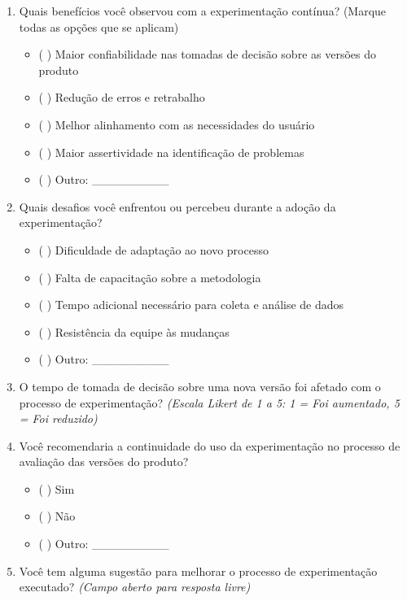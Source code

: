 \begin{enumerate}
        \item Quais benefícios você observou com a experimentação contínua? (Marque todas as opções que se aplicam)
        \begin{itemize}
            \item ( ) Maior confiabilidade nas tomadas de decisão sobre as versões do produto
            \item ( ) Redução de erros e retrabalho
            \item ( ) Melhor alinhamento com as necessidades do usuário
            \item ( ) Maior assertividade na identificação de problemas
            \item ( ) Outro: \_\_\_\_\_\_\_\_\_
        \end{itemize}
    
        \item Quais desafios você enfrentou ou percebeu durante a adoção da experimentação?
        \begin{itemize}
            \item ( ) Dificuldade de adaptação ao novo processo
            \item ( ) Falta de capacitação sobre a metodologia
            \item ( ) Tempo adicional necessário para coleta e análise de dados
            \item ( ) Resistência da equipe às mudanças
            \item ( ) Outro: \_\_\_\_\_\_\_\_\_
        \end{itemize}
    
        \item O tempo de tomada de decisão sobre uma nova versão foi afetado com o processo de experimentação?  
        \textit{(Escala Likert de 1 a 5: 1 = Foi aumentado, 5 = Foi reduzido)}
    
        \item Você recomendaria a continuidade do uso da experimentação no processo de avaliação das versões do produto?
        \begin{itemize}
            \item ( ) Sim
            \item ( ) Não
            \item ( ) Outro: \_\_\_\_\_\_\_\_\_
        \end{itemize}
    
        \item Você tem alguma sugestão para melhorar o processo de experimentação executado?  
        \textit{(Campo aberto para resposta livre)}
    
    \end{enumerate}